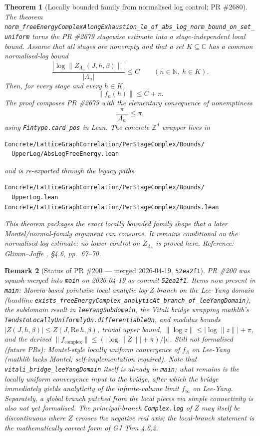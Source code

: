 \documentclass[a4paper,11pt]{article}
\newtheorem{theorem}{Theorem}
\newtheorem{remark}[theorem]{Remark}
\begin{document}
\begin{theorem}[Locally bounded family from normalised log control; PR \#2680]
The theorem
\texttt{norm\_freeEnergyComplexAlongExhaustion\_le\_of\_abs\_log\_norm\_bound\_on\_set\_uniform}
turns the PR \#2679 stagewise estimate into a stage-independent local bound.
Assume that all stages are nonempty and that a set $K\subseteq\mathbb C$ has a
common normalised-log bound
\[
  \frac{\left|\log\|Z_{\Lambda_n}(J,h,\beta)\|\right|}{|\Lambda_n|}
  \le C
  \qquad (n\in\mathbb N,\ h\in K).
\]
Then, for every stage and every $h\in K$,
\[
  \|f_n(h)\|\le C+\pi .
\]
The proof composes PR \#2679 with the elementary consequence of nonemptiness
\[
  \frac{\pi}{|\Lambda_n|}\le \pi ,
\]
using \texttt{Fintype.card\_pos} in Lean.  The concrete $\mathbb Z^d$ wrapper
lives in
\begin{Verbatim}[fontsize=\footnotesize]
Concrete/LatticeGraphCorrelation/PerStageComplex/Bounds/
  UpperLog/AbsLogFreeEnergy.lean
\end{Verbatim}
and is re-exported through the legacy paths
\begin{Verbatim}[fontsize=\footnotesize]
Concrete/LatticeGraphCorrelation/PerStageComplex/Bounds/
  UpperLog.lean
Concrete/LatticeGraphCorrelation/PerStageComplex/Bounds.lean
\end{Verbatim}

This theorem packages the exact locally bounded family shape that a later
Montel/normal-family argument can consume.  It remains conditional on the
normalised-log estimate; no lower control on $Z_{\Lambda_n}$ is proved here.
Reference: Glimm--Jaffe \cite{glimm-jaffe}, \S 4.6, pp.~67--70.
\end{theorem}

\begin{remark}[Status of PR \#200 — merged 2026-04-19, \texttt{52ea2f1}]
PR \#200 was squash-merged into \texttt{main} on 2026-04-19 as
commit \texttt{52ea2f1}. Items now present in \texttt{main}:
Morera-based pointwise local analytic log-$Z$ branch on the Lee-Yang
domain (headline
\texttt{exists\_freeEnergyComplex\_analyticAt\_branch\_of\_leeYangDomain}),
the subdomain result in \texttt{leeYangSubdomain}, the Vitali bridge
wrapping mathlib's
\texttt{TendstoLocallyUniformlyOn.differentiableOn}, and modulus bounds
$|Z(J,h,\beta)|\le Z(J,\mathrm{Re}\,h,\beta)$, trivial upper bound,
$\|\log z\|\le|\log\|z\||+\pi$, and the derived
$\|f_{\text{complex}}\|\le(|\log\|Z\||+\pi)/|\iota|$.
Still not formalised (future PRs): Montel-style locally uniform
convergence of $f_\Lambda$ on Lee-Yang (mathlib lacks Montel;
self-implementation required). Note that
\texttt{vitali\_bridge\_leeYangDomain} itself \emph{is} already in
\texttt{main}; what remains is the locally uniform convergence
\emph{input} to the bridge, after which the bridge immediately
yields analyticity of the infinite-volume limit $f_\infty$ on
Lee-Yang. Separately, a global branch patched from the local
pieces via simple connectivity is also not yet formalised.
The principal-branch \texttt{Complex.log} of $Z$ may itself be
discontinuous where $Z$ crosses the negative real axis; the
local-branch statement is the mathematically correct form of GJ
Thm 4.6.2.
\end{remark}
\end{document}
